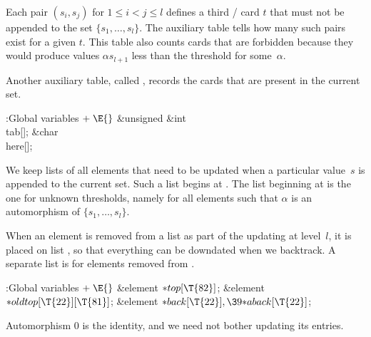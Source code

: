 Each pair $(s_i,s_j)$ for $1\le i<j\le l$ defines a third \SET/ card $t$
that must not be appended to the set $\{s_1,\ldots,s_l\}$. The auxiliary
table  tells how many such pairs exist for a given $t$.
This table also counts cards that are forbidden because they would
produce values $\alpha s_{l+1}$ less than the threshold for some~$\alpha$.

Another auxiliary table, called , records the cards that are
present
in the current set.

\Y\B\4:Global variables\X${}\mathrel+\E{}$\6
\&{unsigned} \&{int} \\{tab}[];\6
\&{char} \\{here}[];\par
\fi

We keep lists of all elements that need to be updated when a particular
value~$s$ is appended to the current set. Such a list begins at
. The list beginning at  is the one for
unknown
thresholds, namely for all elements such that $\alpha$ is an automorphism
of $\{s_1,\ldots,s_l\}$.

When an element is removed from a list as part of the updating at level~$l$,
it is placed on list , so that everything can be downdated
when we backtrack. A separate list  is for elements removed
from .

\Y\B\4:Global variables\X${}\mathrel+\E{}$\6
\&{element} ${}{*}\\{top}[\T{82}]{}$;\6
\&{element} ${}{*}\\{oldtop}[\T{22}][\T{81}]{}$;\6
\&{element} ${}{*}\\{back}[\T{22}],\39{*}\\{aback}[\T{22}]{}$;\par
\fi

Automorphism 0 is the identity, and we need not bother updating its
entries.

